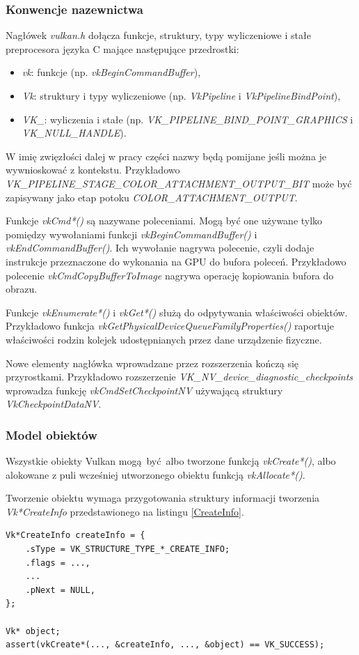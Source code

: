 \subsubsection{Konwencje nazewnictwa}
Nagłówek \textit{vulkan.h} dołącza funkcje, struktury, typy wyliczeniowe i stałe preprocesora języka C mające następujące przedrostki:
\begin{itemize}
	\item \textit{vk}: funkcje (np. \textit{vkBeginCommandBuffer}),
	\item \textit{Vk}: struktury i typy wyliczeniowe (np. \textit{VkPipeline} i  \textit{VkPipelineBindPoint}),
	\item \textit{VK\_}: wyliczenia i stałe (np. \textit{VK\_PIPELINE\_BIND\_POINT\_GRAPHICS} i \textit{VK\_NULL\_HANDLE}).
\end{itemize}
W imię zwięzłości dalej w pracy części nazwy będą pomijane jeśli można je wywnioskować z kontekstu. Przykładowo \textit{VK\_PIPELINE\_STAGE\_COLOR\_ATTACHMENT\_OUTPUT\_BIT} może być zapisywany jako etap potoku \textit{COLOR\_ATTACHMENT\_OUTPUT}.

Funkcje \textit{vkCmd*()} są nazywane poleceniami.
Mogą być one używane tylko pomiędzy wywołaniami funkcji \textit{vkBeginCommandBuffer()} i \textit{vkEndCommandBuffer()}. Ich wywołanie nagrywa polecenie, czyli dodaje instrukcje przeznaczone do wykonania na GPU do bufora poleceń.
Przykładowo polecenie \textit{vkCmdCopyBufferToImage} nagrywa operację kopiowania bufora do obrazu.

Funkcje \textit{vkEnumerate*()} i \textit{vkGet*()} służą do odpytywania właściwości obiektów. Przykładowo funkcja \textit{vkGetPhysicalDeviceQueueFamilyProperties()} raportuje właściwości rodzin kolejek udostępnianych przez dane urządzenie fizyczne.

Nowe elementy nagłówka wprowadzane przez rozszerzenia kończą się przyrostkami. Przykładowo rozszerzenie \textit{VK\_NV\_device\_diagnostic\_checkpoints} wprowadza funkcję \textit{vkCmdSetCheckpointNV} używającą struktury \textit{VkCheckpointDataNV}.

\subsubsection{Model obiektów}

Wszystkie obiekty Vulkan mogą być albo tworzone funkcją \textit{vkCreate*()}, albo alokowane z puli wcześniej utworzonego obiektu funkcją \textit{vkAllocate*()}.

Tworzenie obiektu wymaga przygotowania struktury informacji tworzenia \textit{Vk*CreateInfo} przedstawionego na listingu \ref{CreateInfo}.
\lstset{language=C}
\begin{lstlisting}[caption={Tworzenie obiektu Vulkan},captionpos=b,label={CreateInfo}]
Vk*CreateInfo createInfo = {
	.sType = VK_STRUCTURE_TYPE_*_CREATE_INFO;
	.flags = ...,
	...
	.pNext = NULL,
};

Vk* object;
assert(vkCreate*(..., &createInfo, ..., &object) == VK_SUCCESS);
\end{lstlisting}

